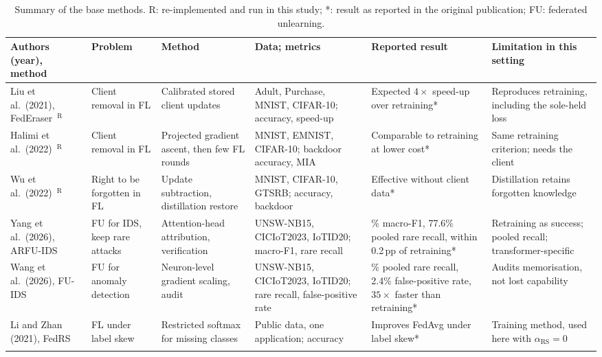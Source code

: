 \documentclass[pdflatex,sn-mathphys-num,iicol]{sn-jnl}
\begin{document}
\begin{table}[t]
\caption{Summary of the base methods. R: re-implemented and run in this study; *: result as reported in the original publication; FU: federated unlearning.}\label{tab:basesum}
\scriptsize
\setlength{\tabcolsep}{3pt}
\begin{tabular*}{\textwidth}{@{\extracolsep\fill}>{\raggedright\arraybackslash}p{2.2cm}>{\raggedright\arraybackslash}p{1.9cm}>{\raggedright\arraybackslash}p{2.5cm}>{\raggedright\arraybackslash}p{2.6cm}>{\raggedright\arraybackslash}p{2.8cm}>{\raggedright\arraybackslash}p{2.8cm}@{}}
\toprule
Authors (year), method & Problem & Method & Data; metrics & Reported result & Limitation in this setting \\
\midrule
Liu et al.\ (2021), FedEraser~\cite{liu2021federaser}$^{\mathrm{R}}$ & Client removal in FL & Calibrated stored client updates & Adult, Purchase, MNIST, CIFAR-10; accuracy, speed-up & Expected $4\times$ speed-up over retraining* & Reproduces retraining, including the sole-held loss \\
Halimi et al.\ (2022)~\cite{halimi2022}$^{\mathrm{R}}$ & Client removal in FL & Projected gradient ascent, then few FL rounds & MNIST, EMNIST, CIFAR-10; backdoor accuracy, MIA & Comparable to retraining at lower cost* & Same retraining criterion; needs the client \\
Wu et al.\ (2022)~\cite{wu2022distill}$^{\mathrm{R}}$ & Right to be forgotten in FL & Update subtraction, distillation restore & MNIST, CIFAR-10, GTSRB; accuracy, backdoor & Effective without client data* & Distillation retains forgotten knowledge \\
Yang et al.\ (2026), ARFU-IDS~\cite{yang2026arfu} & FU for IDS, keep rare attacks & Attention-head attribution, verification & UNSW-NB15, CICIoT2023, IoTID20; macro-F1, rare recall & 87.1\% macro-F1, 77.6\% pooled rare recall, within 0.2\,pp of retraining* & Retraining as success; pooled recall; transformer-specific \\
Wang et al.\ (2026), FU-IDS~\cite{wang2026fuids} & FU for anomaly detection & Neuron-level gradient scaling, audit & UNSW-NB15, CICIoT2023, IoTID20; rare recall, false-positive rate & 73.9\% pooled rare recall, 2.4\% false-positive rate, $35\times$ faster than retraining* & Audits memorisation, not lost capability \\
Li and Zhan (2021), FedRS~\cite{li2021fedrs} & FL under label skew & Restricted softmax for missing classes & Public data, one application; accuracy & Improves FedAvg under label skew* & Training method, used here with $\alpha_{\mathrm{RS}}=0$ \\
\botrule
\end{tabular*}
\end{table}
\end{document}

